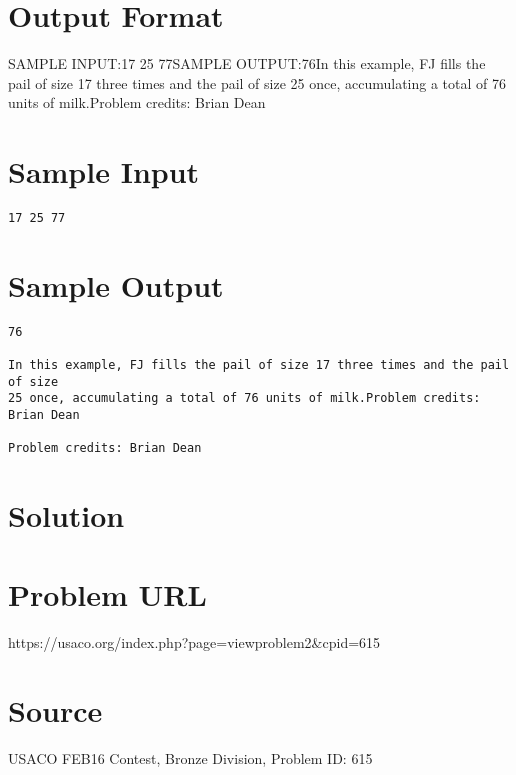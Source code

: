 \documentclass[12pt]{article}
\begin{document}
\section*{Output Format}
SAMPLE INPUT:17 25 77SAMPLE OUTPUT:76In this example, FJ fills the pail of size 17 three times and the pail of size
25 once, accumulating a total of 76 units of milk.Problem credits: Brian Dean

\section*{Sample Input}
\begin{verbatim}
17 25 77
\end{verbatim}

\section*{Sample Output}
\begin{verbatim}
76

In this example, FJ fills the pail of size 17 three times and the pail of size
25 once, accumulating a total of 76 units of milk.Problem credits: Brian Dean

Problem credits: Brian Dean
\end{verbatim}

\section*{Solution}


\section*{Problem URL}
https://usaco.org/index.php?page=viewproblem2&cpid=615

\section*{Source}
USACO FEB16 Contest, Bronze Division, Problem ID: 615
\end{document}
